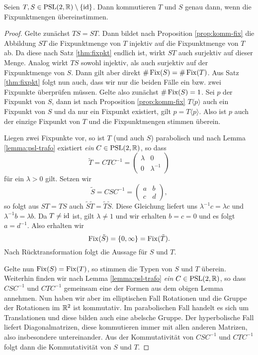 \begin{thm}
  \label{thm:komm-fix}
  Seien $T,S \in \operatorname{PSL}(2, \mathbb{R})\setminus \{\operatorname{id}\}$. Dann kommutieren $T$ und $S$ genau dann,
  wenn die Fixpunktmengen übereinstimmen.
\end{thm}

\begin{proof}
  Gelte zunächst $TS = ST$. Dann bildet nach Proposition
  \ref{prop:komm-fix} die Abbildung $ST$ die Fixpunktmenge von $T$
  injektiv auf die Fixpunktmenge von $T$ ab. Da diese nach Satz
  \ref{thm:fixpkt} endlich ist, wirkt $ST$ auch surjektiv auf dieser
  Menge. Analog wirkt $TS$ sowohl injektiv, als auch surjektiv auf der
  Fixpunktmenge von $S$. Dann gilt aber direkt $\# \operatorname{Fix}(S) = \#
  \operatorname{Fix}(T)$. Aus Satz \ref{thm:fixpkt} folgt nun auch, dass wir nur die
  beiden Fälle ein bzw. zwei Fixpunkte überprüfen müssen. Gelte also
  zunächst $\# \operatorname{Fix}(S) = 1$. Sei $p$ der Fixpunkt von $S$, dann ist
  nach Proposition \ref{prop:komm-fix} $T\langle p \rangle$ auch ein
  Fixpunkt von $S$ und da nur ein Fixpunkt existiert, gilt $ p = T
  \langle p \rangle$. Also ist $p$ auch der einzige Fixpunkt von $T$
  und die Fixpunktmengen stimmen überein.

  Liegen zwei Fixpunkte vor, so ist $T$ (und auch
  $S$) parabolisch und nach Lemma \ref{lemma:psl-trafo} existiert \emph{ein}
  $C \in \operatorname{PSL}(2,\mathbb{R})$, so dass
  \[
  \tilde T = C T C^{-1} =
  \begin{pmatrix}
    \lambda & 0 \\
    0 & \lambda^{-1}
  \end{pmatrix}
  \]
  für ein $\lambda > 0$ gilt. Setzen wir
  \[
  \tilde S = C S C^{-1} =
  \begin{pmatrix}
    a & b \\
    c & d
  \end{pmatrix},
  \]
  so folgt aus $ST = TS$ auch $\tilde S \tilde T = \tilde T \tilde
  S$. Diese Gleichung liefert uns $\lambda^{-1} c = \lambda c$ und
  $\lambda^{-1} b = \lambda b$. Da $T \neq \operatorname{id}$ ist, gilt $\lambda \neq 1$ und
  wir erhalten $b = c = 0$ und es folgt $a = d^{-1}$. Also
  erhalten wir
  \[
  \operatorname{Fix}(\tilde S) = \{0, \infty\} = \operatorname{Fix}(\tilde T).
  \]
  Nach Rücktransformation folgt die Aussage für $S$ und $T$.

  Gelte nun $\operatorname{Fix}(S) = \operatorname{Fix}(T)$, so stimmen die Typen von $S$ und $T$
  überein. Weiterhin finden wir nach Lemma \ref{lemma:psl-trafo} \emph{ein} $C
  \in \operatorname{PSL}(2, \mathbb{R})$, so dass $C S C^{-1}$ und $C T C^{-1}$ gemeinsam
  eine der Formen aus dem obigen Lemma annehmen. Nun haben wir aber im
  elliptischen Fall Rotationen und die Gruppe der Rotationen im $\mathbb{R}^2$
  ist kommutativ. Im parabolischen Fall handelt es sich um
  Translationen und diese bilden auch eine abelsche Gruppe. Der
  hyperbolische Fall liefert Diagonalmatrizen, diese kommutieren immer
  mit allen anderen Matrizen, also insbesondere
  untereinander. Aus der Kommutativität von $C S C^{-1}$ und $C T
  C^{-1}$ folgt dann die Kommutativität von $S$ und $T$.
\end{proof}


